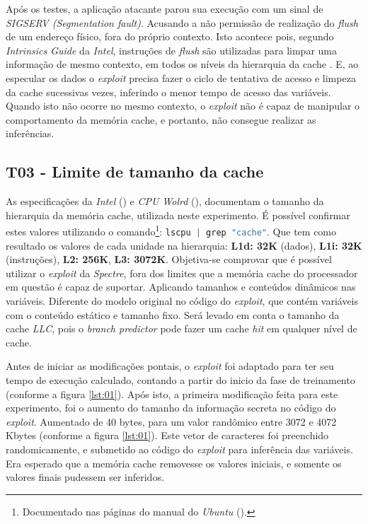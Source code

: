 \documentclass[
	article,			    %
	12pt,				    %
	oneside,			    %
	a4paper,			    %
	chapter=TITLE,		    %
	section=TITLE,		    %
	subsection=TITLE,	    %
	english,			    %
	brazil,				    %
	sumario=tradicional
]{abntex2}
\begin{document}
Após os testes, a aplicação atacante parou sua execução com um sinal de \emph{SIGSERV (Segmentation fault)}. Acusando a não permissão de realização do \emph{flush} de um endereço físico, fora do próprio contexto. Isto acontece pois, segundo \emph{Intrinsics Guide} da \emph{Intel}, instruções de \emph{flush} são utilizadas para limpar uma informação de mesmo contexto, em todos os níveis da hierarquia da cache \cite{Intel2018Intrinsics}. E, ao especular os dados o \emph{exploit} precisa fazer o ciclo de tentativa de acesso e limpeza da cache sucessivas vezes, inferindo o menor tempo de acesso das variáveis. Quando isto não ocorre no mesmo contexto, o \emph{exploit} não é capaz de manipular o comportamento da memória cache, e portanto, não consegue realizar as inferências.

\begin{comment}
explicar mais sobre o que é "contexto" nesse sentindo
\end{comment}

\subsection{T03 - Limite de tamanho da cache}
As especificações da \emph{Intel} (\citeyear{Intel2019Corei3}) e \emph{CPU Wolrd} (\citeyear{CPU2016Corei3}), documentam o tamanho da hierarquia da memória cache, utilizada neste experimento. É possível confirmar estes valores utilizando o comando\footnote{Documentado nas páginas do manual do \emph{Ubuntu} (\citeyear{Ubuntu2019Lscpu}).}: \lstinline[language=C, style=c]{lscpu | grep "cache"}. Que tem como resultado os valores de cada unidade na hierarquia: \textbf{L1d: 32K} (dados), \textbf{L1i: 32K} (instruções), \textbf{L2: 256K}, \textbf{L3: 3072K}. Objetiva-se comprovar que é possível utilizar o \emph{exploit} da \emph{Spectre}, fora dos limites que a memória cache do processador em questão é capaz de suportar. Aplicando tamanhos e conteúdos dinâmicos nas variáveis. Diferente do modelo original no código do \emph{exploit}, que contém variáveis com o conteúdo estático e tamanho fixo. Será levado em conta o tamanho da cache \emph{LLC}, pois o \emph{branch predictor} pode fazer um cache \emph{hit} em qualquer nível de cache.



Antes de iniciar as modificações pontais, o \emph{exploit} foi adaptado para ter seu tempo de execução calculado, contando a partir do inicio da fase de treinamento (conforme a figura \ref{lst:01}). Após isto, a primeira modificação feita para este experimento, foi o aumento do tamanho da informação secreta no código do \emph{exploit}. Aumentado de 40 bytes, para um valor randômico entre 3072 e 4072 Kbytes (conforme a figura \ref{lst:01}). Este vetor de caracteres foi preenchido randomicamente, e submetido ao código do \emph{exploit} para inferência das variáveis. Era esperado que a memória cache removesse os valores iniciais, e somente os valores finais pudessem ser inferidos.
\end{document}
